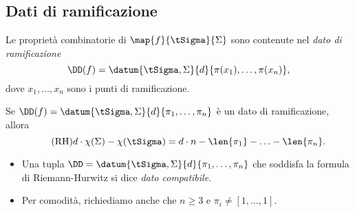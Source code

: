 \subsection{Dati di ramificazione}
\begin{frame}
Le proprietà combinatorie di $\map{f}{\tSigma}{\Sigma}$ sono contenute nel \emph{dato di ramificazione}
\[
\DD(f)=\datum{\tSigma,\Sigma}{d}{\pi(x_1),\ldots,\pi(x_n)},
\]
dove $x_1,\ldots,x_n$ sono i punti di ramificazione.
\begin{mybox}[title=Formula di Riemann-Hurwitz]
Se $\DD(f)=\datum{\tSigma,\Sigma}{d}{\pi_1,\ldots,\pi_n}$ è un dato di ramificazione, allora
\begin{equation}\tag{RH}
d\cdot\chi(\Sigma)-\chi(\tSigma)=d\cdot n-\len{\pi_1}-\ldots-\len{\pi_n}.
\end{equation}
\end{mybox}
\begin{itemize}
\item Una tupla $\DD=\datum{\tSigma,\Sigma}{d}{\pi_1,\ldots,\pi_n}$ che soddisfa la formula di Riemann-Hurwitz si dice \emph{dato compatibile}.
\item Per comodità, richiediamo anche che $n\ge 3$ e $\pi_i\neq[1,\ldots,1]$.
\end{itemize}
\end{frame}

